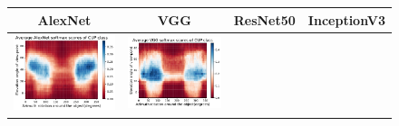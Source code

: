 \begin{figure}[h]
\centering
\tabcolsep=0.03cm
   \begin{tabular}{||c|c|c|c||} \hline
   \textbf{AlexNet} & \textbf{VGG} &\textbf{ResNet50} & \textbf{InceptionV3} \\ \hline
\includegraphics[width = 4cm]{supimages/nms2d/AlexNet_cup_Average.pdf}&
\includegraphics[width = 4cm]{supimages/nms2d/VGG_cup_Average.pdf}&

\end{tabular}
\end{figure}
